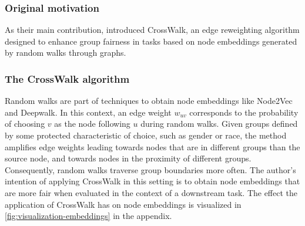 


\subsubsection*{Original motivation}

As their main contribution, \citet{Khajehnejad2022} introduced CrossWalk, an edge reweighting algorithm designed to enhance group fairness in tasks based on node embeddings generated by random walks through graphs.

\subsubsection*{The CrossWalk algorithm}


Random walks are part of techniques to obtain node embeddings like Node2Vec and Deepwalk. 
In this context, an edge weight $w_{uv}$ corresponds to the probability of choosing $v$ as the node following $u$ during random walks.
Given groups defined by some protected characteristic of choice, such as gender or race, the method amplifies edge weights leading towards nodes that are in different groups than the source node, and towards nodes in the proximity of different groups. 
Consequently, random walks traverse group boundaries more often.
The author's intention of applying CrossWalk in this setting is to obtain node embeddings that are more fair when evaluated in the context of a downstream task.
The effect the application of CrossWalk has on node embeddings is visualized in \autoref{fig:visualization-embeddings} in the appendix.

